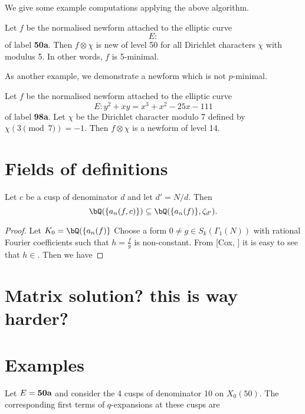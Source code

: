 \documentclass [11pt, proquest] {uwthesis}[2015/03/03]
\begin{document}
We give some example computations applying the above algorithm. 

\begin{Example}
Let $f$ be the normalised newform attached to the elliptic curve 
\[
	E: 
\]
of label {\bf 50a}. Then $f \otimes \chi$ is new of level 50 for all Dirichlet characters $\chi$ with modulus 5. 
In other words, $f$ is 5-minimal. 
\end{Example}

As another example, we demonstrate a newform which is not $p$-minimal. 
\begin{Example}
Let $f$ be the normalised newform attached to the elliptic curve 
\[
E: y^2 + x y = x^{3} + x^{2} - 25 x - 111
\]
of label {\bf 98a}. Let $\chi$ be the Dirichlet character modulo 7 defined by $\chi(3 \pmod{7}) = -1$. 
Then $f \otimes \chi$ is a newform of level 14. 

\end{Example}

\section{Fields of definitions}

\begin{Lemma}
Let $c$ be a cusp of denominator $d$ and let $d' = N/d$. Then 
\[
	\bQ(\{a_n(f, c)\}) \subseteq \bQ( \{a_n(f)\}, \zeta_{d'}). 
\]
\end{Lemma}

\begin{proof}
Let $K_0 = \bQ( \{a_n(f)\}$
Choose a form $0 \neq g \in S_k(\Gamma_1(N))$ with rational Fourier coefficients such that 
$h = \frac{f}{g}$ is non-constant. From [Cox, ] it is easy to see that $h \in $. Then we have 
\end{proof}



\section{Matrix solution? this is way harder? }



\section{Examples}

Let $E = {\bf 50a}$ and consider the 4 cusps of denominator 10 on $X_0(50)$. The corresponding first terms 
of $q$-expansions at these cusps are 
\end{document}
